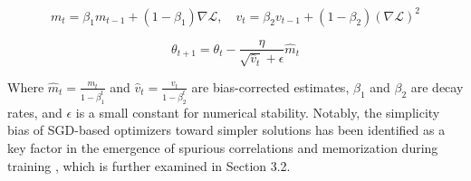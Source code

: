\begin{equation}
m_t = \beta_1 m_{t-1} + (1-\beta_1)\nabla\mathcal{L}, 
\quad v_t = \beta_2 v_{t-1} + 
(1-\beta_2)(\nabla\mathcal{L})^2
\label{eq:adammoments}
\end{equation}

\begin{equation}
\theta_{t+1} = \theta_t - \frac{\eta}{\sqrt{\hat{v}_t} 
+ \epsilon} \hat{m}_t
\label{eq:adamupdate}
\end{equation}

Where $\hat{m}_t = \frac{m_t}{1-\beta_1^t}$ and 
$\hat{v}_t = \frac{v_t}{1-\beta_2^t}$ are bias-corrected 
estimates, $\beta_1$ and $\beta_2$ are decay rates, and 
$\epsilon$ is a small constant for numerical stability. 
Notably, the simplicity bias of SGD-based optimizers toward 
simpler solutions has been identified as a key factor in 
the emergence of spurious correlations and memorization 
during training \cite{yang_yu_4720d432}, which is further 
examined in Section 3.2. 